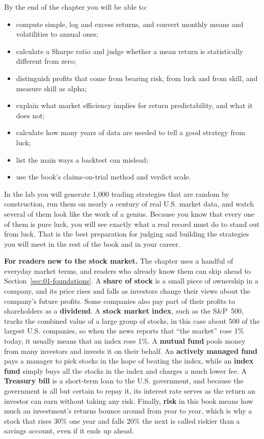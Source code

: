 By the end of the chapter you will be able to:

\begin{itemize}
  \item compute simple, log and excess returns, and convert monthly means and volatilities to annual ones;
  \item calculate a Sharpe ratio and judge whether a mean return is statistically different from zero;
  \item distinguish profits that come from bearing risk, from luck and from skill, and measure skill as alpha;
  \item explain what market efficiency implies for return predictability, and what it does not;
  \item calculate how many years of data are needed to tell a good strategy from luck;
  \item list the main ways a backtest can mislead;
  \item use the book's claims-on-trial method and verdict scale.
\end{itemize}

In the lab you will generate 1,000 trading strategies that are random by construction, run them on nearly a century of real U.S. market data, and watch several of them look like the work of a genius. Because you know that every one of them is pure luck, you will see exactly what a real record must do to stand out from luck. That is the best preparation for judging and building the strategies you will meet in the rest of the book and in your career.

\begin{callout}
\textbf{For readers new to the stock market.} The chapter uses a handful of everyday market terms, and readers who already know them can skip ahead to Section~\ref{sec:01-foundations}. A \textbf{share of stock} is a small piece of ownership in a company, and its price rises and falls as investors change their views about the company's future profits. Some companies also pay part of their profits to shareholders as a \textbf{dividend}. A \textbf{stock market index}, such as the S\&P~500, tracks the combined value of a large group of stocks, in this case about 500 of the largest U.S. companies, so when the news reports that ``the market'' rose 1\% today, it usually means that an index rose 1\%. A \textbf{mutual fund} pools money from many investors and invests it on their behalf. An \textbf{actively managed fund} pays a manager to pick stocks in the hope of beating the index, while an \textbf{index fund} simply buys all the stocks in the index and charges a much lower fee. A \textbf{Treasury bill} is a short-term loan to the U.S. government, and because the government is all but certain to repay it, its interest rate serves as the return an investor can earn without taking any risk. Finally, \textbf{risk} in this book means how much an investment's returns bounce around from year to year, which is why a stock that rises 30\% one year and falls 20\% the next is called riskier than a savings account, even if it ends up ahead.
\end{callout}

